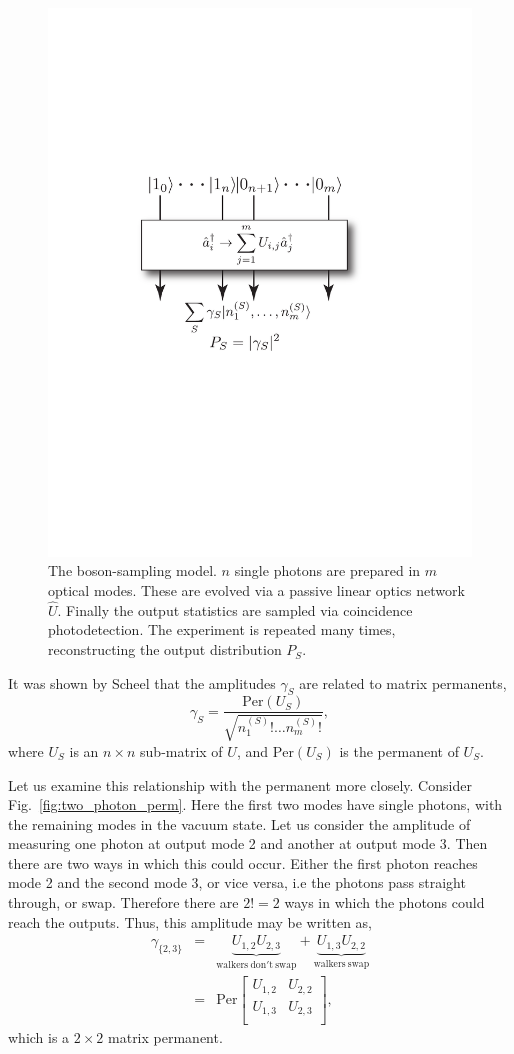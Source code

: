 \documentclass[aps,pra,twocolumn,amsmath,amssymb,nofootinbib,superscriptaddress]{revtex4}
\begin{document}
\begin{figure}[!htb]
\includegraphics[width=0.7\columnwidth]{model}
\caption{The boson-sampling model. $n$ single photons are prepared in $m$ optical modes. These are evolved via a passive linear optics network $\hat{U}$. Finally the output statistics are sampled via coincidence photodetection. The experiment is repeated many times, reconstructing the output distribution $P_S$.} \label{fig:model}
\end{figure}

It was shown by Scheel \cite{bib:Scheel04perm} that the amplitudes $\gamma_S$ are related to matrix permanents,
\begin{equation}
\gamma_S = \frac{\mathrm{Per}(U_S)}{\sqrt{n_1^{(S)}!\dots n_m^{(S)}!}},
\end{equation}
where $U_S$ is an \mbox{$n\times n$} sub-matrix of $U$, and \mbox{$\mathrm{Per}(U_S)$} is the permanent of $U_S$.

Let us examine this relationship with the permanent more closely. Consider Fig.~\ref{fig:two_photon_perm}. Here the first two modes have single photons, with the remaining modes in the vacuum state. Let us consider the amplitude of measuring one photon at output mode 2 and another at output mode 3. Then there are two ways in which this could occur. Either the first photon reaches mode 2 and the second mode 3, or vice versa, i.e the photons pass straight through, or swap. Therefore there are \mbox{$2!=2$} ways in which the photons could reach the outputs. Thus, this amplitude may be written as,
\begin{eqnarray} \label{eq:coinProbEx}
\gamma_{\{2,3\}} &=& \underbrace{U_{1,2}U_{2,3}}_{\mathrm{walkers\ don't\ swap}} + \underbrace{U_{1,3}U_{2,2}}_{\mathrm{walkers\ swap}} \nonumber \\
&=& \mathrm{Per} \left[ {\begin{array}{cc}
   U_{1,2} & U_{2,2} \\
   U_{1,3} & U_{2,3} \\
  \end{array} } \right],
\end{eqnarray}
which is a \mbox{$2\times 2$} matrix permanent.
\end{document}
